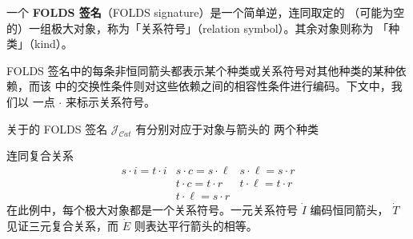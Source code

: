 \begin{definition}\label{def:folds-signature}
一个 \textbf{FOLDS 签名}（FOLDS signature）是一个简单逆\trCategory{}，连同取定的
（可能为空的）一组极大对象，称为「关系符号」（relation symbol）。其余对象则称为
「种类」（kind）。
\end{definition}

FOLDS 签名中的每条非恒同箭头都表示某个种类或关系符号对其他种类的某种依赖，而该%
\trCategory{}中的交换性条件则对这些依赖之间的相容性条件进行编码。下文中，我们以
一点 $\cdot$ 来标示关系符号。

\begin{example}\label{exa:folds-signature-categories}
关于\trCategory{}的 FOLDS 签名 $\mathcal{J}_{\mathcal{C}at}$ 有分别对应于对象与箭头的
两个种类
\begin{center}
\end{center}
连同复合关系
\begin{equation*}
\begin{array}{ccc}
s\cdot i = t\cdot i & s\cdot c = s\cdot \ell & s\cdot \ell = s\cdot r\\
 & t\cdot c = t\cdot r & t\cdot \ell = t\cdot r\\
 & t\cdot \ell = s\cdot r &
\end{array}
\end{equation*}
在此例中，每个极大对象都是一个关系符号。一元关系符号 $\dot{I}$ 编码恒同箭头，
$\dot{T}$ 见证三元复合关系，而 $\dot{E}$ 则表达平行箭头的相等。
\end{example}

